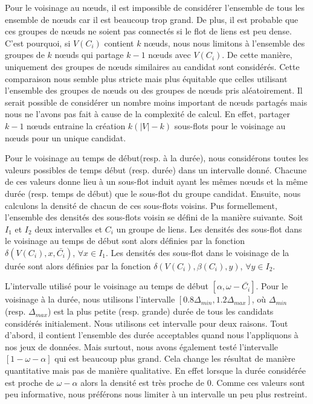 Pour le voisinage au n\oe uds, il est impossible de considérer l'ensemble de tous les ensemble de n\oe uds car il est beaucoup trop grand.
De plus, il est probable que ces groupes de n\oe uds ne soient pas connectés si le flot de liens est peu dense.
C'est pourquoi, si $V(C_i)$ contient $k$ n\oe uds, nous nous limitons à l'ensemble des groupes de $k$ n\oe uds qui partage $k-1$ n\oe uds avec $V(C_i)$.
De cette manière, uniquement des groupes de n\oe uds similaires au candidat sont considérés.
Cette comparaison nous semble plus stricte mais plus équitable que celles utilisant l'ensemble des groupes de n\oe uds ou des groupes de n\oe uds pris aléatoirement.
Il serait possible de considérer un nombre moins important de n\oe uds partagés mais nous ne l'avons pas fait à cause de la complexité de calcul.
En effet, partager $k-1$ n\oe uds entraine la création $k(|V|-k)$ sous-flots pour le voisinage au n\oe uds pour un unique candidat.

Pour le voisinage au temps de début(resp. à la durée), nous considérons toutes les valeurs possibles de temps début (resp. durée) dans un intervalle donné.
Chacune de ces valeurs donne lieu à un sous-flot induit ayant les mêmes n\oe uds et la même durée (resp. temps de début) que le sous-flot du groupe candidat.
Ensuite, nous calculons la densité de chacun de ces sous-flots voisins.
Pus formellement, l'ensemble des densités des sous-flots voisin se défini de la manière suivante.
Soit $I_1$ et $I_2$ deux intervalles et $C_i$ un groupe de liens.
Les densités des sous-flot dans le voisinage au temps de début sont alors définies par la fonction $\delta(V(C_i),x, \bar{C_i})$, $\forall x \in I_1$.
Les densités des sous-flot dans le voisinage de la durée sont alors définies par la fonction $\delta(V(C_i),\beta(C_i), y)$, $\forall y \in I_2$.

L'intervalle utilisé pour le voisinage au temps de début $[\alpha, \omega-\bar{C_i}]$.
Pour le voisinage à la durée, nous utilisons l'intervalle $[0.8\Delta_{min}, 1.2\Delta_{max}]$, où $\Delta_{min}$ (resp. $\Delta_{max}$) est la plus petite (resp. grande) durée de tous les candidats considérés initialement.
Nous utilisons cet intervalle pour deux raisons.
Tout d'abord, il contient l'ensemble des durée acceptables quand nous l'appliquons à nos jeux de données.
Mais surtout, nous avons également testé l'intervalle $[1-\omega-\alpha]$ qui est beaucoup plus grand.
Cela change les résultat de manière quantitative mais pas de manière qualitative.
En effet lorsque la durée considérée est proche de $\omega-\alpha$ alors la densité est très proche de $0$.
Comme ces valeurs sont peu informative, nous préférons nous limiter à un intervalle un peu plus restreint.
\bigskip

